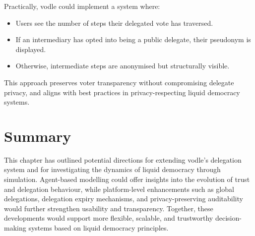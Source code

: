 Practically, vodle could implement a system where:
\begin{itemize}
    \item Users see the number of steps their delegated vote has traversed.
    \item If an intermediary has opted into being a public delegate, their pseudonym is displayed.
    \item Otherwise, intermediate steps are anonymised but structurally visible.
\end{itemize}

This approach preserves voter transparency without compromising delegate privacy, and aligns with best practices in privacy-respecting liquid democracy systems.

\section{Summary}

This chapter has outlined potential directions for extending vodle's delegation system and for investigating the dynamics of liquid democracy through simulation. Agent-based modelling could offer insights into the evolution of trust and delegation behaviour, while platform-level enhancements such as global delegations, delegation expiry mechanisms, and privacy-preserving auditability would further strengthen usability and transparency. Together, these developments would support more flexible, scalable, and trustworthy decision-making systems based on liquid democracy principles.
